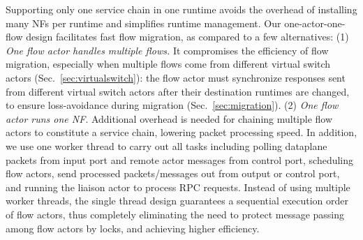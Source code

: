 




\vspace{1mm}
 Supporting only one service chain in one runtime avoids the overhead of installing many NFs per runtime and simplifies runtime management. Our one-actor-one-flow design facilitates fast flow migration, as compared to a few alternatives: (1) {\em One flow actor handles multiple flows.} It compromises the efficiency of flow migration, especially when multiple flows come from different virtual switch actors (Sec.~\ref{sec:virtualswitch}): the flow actor must synchronize responses sent from different virtual switch actors after their destination runtimes are changed, to ensure loss-avoidance during migration (Sec.~\ref{sec:migration}). 
 (2) {\em One flow actor runs one NF}. Additional overhead is needed for chaining multiple flow actors to constitute a service chain, lowering packet processing speed. %
 In addition, we use one worker thread to carry out all tasks including polling dataplane packets from input port and remote actor messages from control port, scheduling flow actors, send processed packets/messages out from output or control port,
and running the liaison actor to process RPC requests. Instead of using multiple worker threads, the single thread design guarantees a sequential execution order of flow actors, thus completely eliminating the need to protect message passing among flow actors by locks, and achieving higher efficiency.




